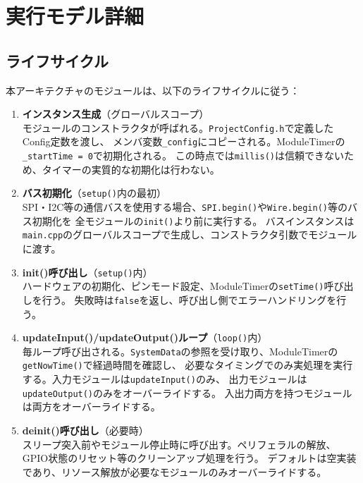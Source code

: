 \section{実行モデル詳細}

\subsection{ライフサイクル}

本アーキテクチャのモジュールは、以下のライフサイクルに従う：

\begin{enumerate}
    \item \textbf{インスタンス生成}（グローバルスコープ） \\
    モジュールのコンストラクタが呼ばれる。\texttt{ProjectConfig.h}で定義したConfig定数を渡し、
    メンバ変数\texttt{\_config}にコピーされる。ModuleTimerの\texttt{\_startTime = 0}で初期化される。
    この時点では\texttt{millis()}は信頼できないため、タイマーの実質的な初期化は行わない。

    \item \textbf{バス初期化}（\texttt{setup()}内の最初） \\
    SPI・I2C等の通信バスを使用する場合、\texttt{SPI.begin()}や\texttt{Wire.begin()}等のバス初期化を
    全モジュールの\texttt{init()}より前に実行する。
    バスインスタンスは\texttt{main.cpp}のグローバルスコープで生成し、コンストラクタ引数でモジュールに渡す。

    \item \textbf{init()呼び出し}（\texttt{setup()}内） \\
    ハードウェアの初期化、ピンモード設定、ModuleTimerの\texttt{setTime()}呼び出しを行う。
    失敗時は\texttt{false}を返し、呼び出し側でエラーハンドリングを行う。

    \item \textbf{updateInput()/updateOutput()ループ}（\texttt{loop()}内） \\
    毎ループ呼び出される。\texttt{SystemData}の参照を受け取り、ModuleTimerの\texttt{getNowTime()}で経過時間を確認し、
    必要なタイミングでのみ実処理を実行する。入力モジュールは\texttt{updateInput()}のみ、
    出力モジュールは\texttt{updateOutput()}のみをオーバーライドする。
    入出力両方を持つモジュールは両方をオーバーライドする。

    \item \textbf{deinit()呼び出し}（必要時） \\
    スリープ突入前やモジュール停止時に呼び出す。ペリフェラルの解放、GPIO状態のリセット等のクリーンアップ処理を行う。
    デフォルトは空実装であり、リソース解放が必要なモジュールのみオーバーライドする。
\end{enumerate}

